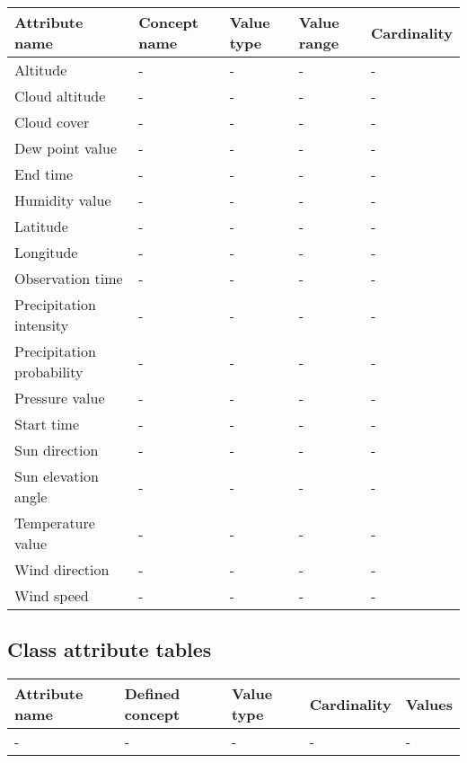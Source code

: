 \begin{longtable}{|p{}|p{}|p{}|p{}|p{}|}
  \hline
  \textbf{Attribute name} & \textbf{Concept name} & \textbf{Value type} & \textbf{Value range} & \textbf{Cardinality} \\
  \hline\hline
  Altitude & - & - & - & - \\
  \hline
  Cloud altitude & - & - & - & - \\
  \hline
  Cloud cover & - & - & - & - \\
  \hline
  Dew point value & - & - & - & - \\
  \hline
  End time & - & - & - & - \\
  \hline
  Humidity value & - & - & - & - \\
  \hline
  Latitude & - & - & - & - \\
  \hline
  Longitude & - & - & - & - \\
  \hline
  Observation time & - & - & - & - \\
  \hline
  Precipitation intensity & - & - & - & - \\
  \hline
  Precipitation probability & - & - & - & - \\
  \hline
  Pressure value & - & - & - & - \\
  \hline
  Start time & - & - & - & - \\
  \hline
  Sun direction & - & - & - & - \\
  \hline
  Sun elevation angle & - & - & - & - \\
  \hline
  Temperature value & - & - & - & - \\
  \hline
  Wind direction & - & - & - & - \\
  \hline
  Wind speed & - & - & - & - \\
  \hline
\end{longtable}

\subsection{Class attribute tables}

\begin{longtable}{|p{}|p{}|p{}|p{}|p{}|}
  \hline
  \textbf{Attribute name} & \textbf{Defined concept} & \textbf{Value type} & \textbf{Cardinality} & \textbf{Values} \\
  \hline\hline
  - & - & - & - & - \\
  \hline
\end{longtable}

